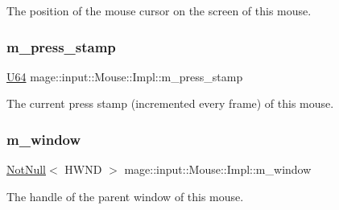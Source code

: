 The position of the mouse cursor on the screen of this mouse. \hypertarget{classmage_1_1input_1_1_mouse_1_1_impl_a18304bef70290efaec61ad9eca140ce8}{}\label{classmage_1_1input_1_1_mouse_1_1_impl_a18304bef70290efaec61ad9eca140ce8} 
\subsubsection{\texorpdfstring{m\+\_\+press\+\_\+stamp}{m\_press\_stamp}}
{\footnotesize\ttfamily \hyperlink{namespacemage_a6672cf3c861707ce4a3235a3eb43941d}{U64} mage\+::input\+::\+Mouse\+::\+Impl\+::m\+\_\+press\+\_\+stamp\hspace{0.3cm}{\ttfamily [private]}}

The current press stamp (incremented every frame) of this mouse. \hypertarget{classmage_1_1input_1_1_mouse_1_1_impl_af478d106ce9e9e12ac32717c5523c7f5}{}\label{classmage_1_1input_1_1_mouse_1_1_impl_af478d106ce9e9e12ac32717c5523c7f5} 
\subsubsection{\texorpdfstring{m\+\_\+window}{m\_window}}
{\footnotesize\ttfamily \hyperlink{namespacemage_a8769f9d670d6b585ea306cb1062af94b}{Not\+Null}$<$ H\+W\+ND $>$ mage\+::input\+::\+Mouse\+::\+Impl\+::m\+\_\+window\hspace{0.3cm}{\ttfamily [private]}}

The handle of the parent window of this mouse. 